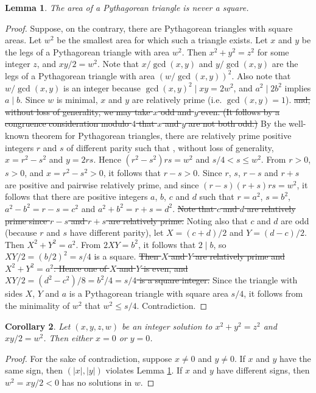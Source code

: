 \documentclass{article}
\newtheorem{lemma}{Lemma}
\numberwithin{lemma}{section}
\newtheorem{corollary}[lemma]{Corollary}
\newcommand{\changed}[1]{{\color{teal} #1}}
\begin{document}
\begin{lemma}\label{lem1}
The area of a Pythagorean triangle is never a square.
\end{lemma}
\begin{proof}
Suppose, on the contrary, there are Pythagorean triangles with square
areas. Let $w^2$ be the smallest area for which such a triangle exists. Let $x$ and $y$ be
the legs of a Pythagorean triangle with area $w^2$. Then $x^2 + y^2 = z^2$ for some integer
$z$, and $xy/2 = w^2$.
\changed{Note that $x/\gcd(x,y)$ and $y/\gcd(x,y)$ are the legs of a Pythagorean triangle with area $(w/\gcd(x,y))^2$. Also note that $w/\gcd(x,y)$ is an integer because $\gcd(x,y)^2 \mid xy = 2w^2$, and $a^2 \mid 2b^2$ implies $a \mid b$.}
Since $w$ is minimal, $x$ and $y$ are relatively prime \changed{(i.e. $\gcd(x,y) = 1$).} \sout{and, without
loss of generality, we may take $x$ odd and $y$ even. (It follows by a congruence
consideration modulo $4$ that $x$ and $y$ are not both odd.)} By the well-known theorem
for Pythagorean triangles, there are relatively prime positive integers $r$ and $s$ of
different parity such that\changed{, without loss of generality,} $x = r^2 - s^2$ and $y = 2rs$. Hence $(r^2-s^2)rs = w^2$ and $s/4 < s \le w^2$. \changed{From $r > 0$, $s > 0$, and $x = r^2-s^2 > 0$, it follows that $r-s > 0$.} Since $r$, $s$, $r-s$ and $r+s$ are \changed{positive and} pairwise relatively prime, and since
$(r-s)(r+s)rs = w^2$, it follows that there are positive integers $a$, $b$, $c$ and $d$ such
that $r = a^2$, $s = b^2$, $a^2-b^2 = r-s = c^2$ and $a^2+b^2 = r+s = d^2$. \sout{Note that $c$
and $d$ are relatively prime since $r-s$ and $r+s$ are relatively prime.} Noting also
that $c$ and $d$ are odd (because $r$ and $s$ have different parity), let $X = (c+d)/2$
and $Y = (d-c)/2$. \changed{Then $X^2+Y^2 = a^2$. From $2XY = b^2$, it follows that $2 \mid b$, so $XY/2 = (b/2)^2 = s/4$ is a square.} \sout{Then $X$ and $Y$ are relatively prime and $X^2+Y^2 = a^2$. Hence
one of $X$ and $Y$ is even, and $XY/2 = (d^2-c^2)/8 = b^2/4 = s/4$ is a square
integer.} Since the triangle with sides $X$, $Y$ and $a$ is a Pythagorean triangle with
square area $s/4$, it follows from the minimality of $w^2$ that $w^2 \le s/4$. Contradiction.
\end{proof}

\changed{
\begin{corollary}\label{cor1}
Let $(x, y, z, w)$ be an integer solution to $x^2+y^2 = z^2$ and $xy/2 = w^2$. Then either $x = 0$ or $y = 0$.
\end{corollary}
\begin{proof}
For the sake of contradiction, suppose $x \ne 0$ and $y \ne 0$. If $x$ and $y$ have the same sign, then $(|x|, |y|)$ violates Lemma \ref{lem1}. If $x$ and $y$ have different signs, then $w^2 = xy/2 < 0$ has no solutions in $w$.
\end{proof}
}
\end{document}
